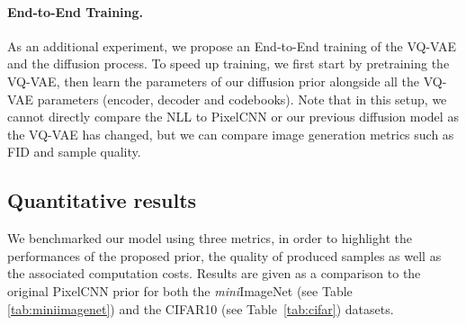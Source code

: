 \documentclass{article}
\theoremstyle{plain}
\theoremstyle{definition}
\theoremstyle{remark}
\begin{document}
\paragraph{End-to-End Training.}
As an additional experiment, we propose an End-to-End training of the VQ-VAE and the diffusion process. To speed up training, we first start by pretraining the VQ-VAE, then learn the parameters of our diffusion prior alongside all the VQ-VAE parameters (encoder, decoder and codebooks). Note that in this setup, we cannot directly compare the NLL to PixelCNN or our previous diffusion model as the VQ-VAE has changed, but we can compare image generation metrics such as FID and sample quality.


\subsection{Quantitative results}
We benchmarked our model using three metrics, in order to highlight the performances of the proposed prior, the quality of produced samples as well as the associated computation costs.
Results are given as a comparison to the original PixelCNN prior for both the \textit{mini}ImageNet (see Table \ref{tab:miniimagenet}) and the CIFAR10 (see Table~\ref{tab:cifar}) datasets.
\end{document}
